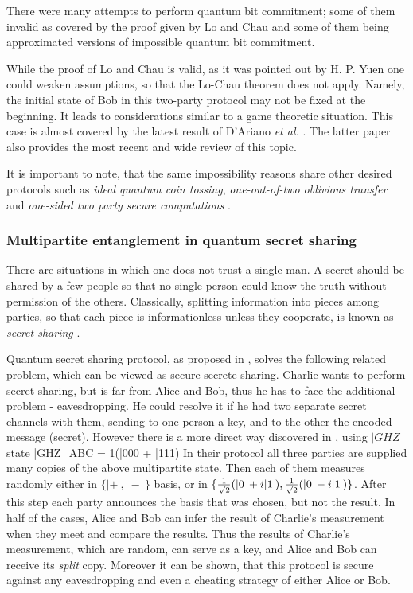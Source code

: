 \documentclass[twocolumn,aps,rmp]{revtex4}
\begin{document}
There were many attempts to perform quantum bit commitment; some of
them invalid as covered by the proof given by Lo and Chau and some
of them being approximated versions of impossible quantum bit
commitment.

While the proof of Lo and Chau is valid, as it was  pointed out by
H. P. Yuen \cite{Yuen_bc} one could weaken assumptions, so that the
Lo-Chau theorem does not apply.  Namely, the initial state of Bob in
this two-party protocol may not be fixed at the beginning. It leads
to considerations similar to a game theoretic situation.
This case is almost covered by the latest result of D'Ariano {\it et
al.} \cite{DAriano_bc}. The latter paper also provides the most recent and
wide review of this topic.

It is important to note, that the same impossibility reasons share other desired protocols such as {\it ideal quantum coin tossing}, {\it one-out-of-two oblivious transfer} and {\it one-sided two party secure computations}
\cite{LoChau_nobitcom2,Lo_noseccomp}.

\subsubsection{Multipartite entanglement in quantum secret sharing}
There are situations in which one does not trust a single man. A
secret should be shared by a few people so that no single person
could know the truth without permission of the others. Classically,
splitting information into pieces among parties, so that each piece
is informationless unless they cooperate, is known as {\it secret
sharing} \cite{Blakley,Shamir}.

Quantum secret sharing protocol, as proposed in \cite{Hillery_secret_sharing}, solves the following related problem, which can be viewed as secure secrete sharing. Charlie wants to perform secret sharing, but is far from Alice and Bob, thus he has to face the additional problem - eavesdropping. He could resolve it if he had two separate secret channels with them,  sending to one person a key, and to the other the encoded message (secret). However there is a more direct way  discovered in \cite{Hillery_secret_sharing}, using $|GHZ\>$ state \be |GHZ\>_{ABC} ={ 1}(|000\> + |111\>) \ee In their protocol all three parties are supplied many copies of the above multipartite state. Then each of them measures randomly either in $\{|+\>,|-\>\}$ basis, or in $\{{
1\over{\sqrt{2}}}(|0\>+i|1\>),{ 1\over{\sqrt{2}}}(|0\>-i|1\>)\}$.
After this step each party announces the basis that was
chosen, but not the result. In half of the cases, Alice and Bob can
infer the result of Charlie's measurement when they meet
and compare the results. Thus the results of Charlie's
measurement, which are random, can serve as a key, and Alice and
Bob can receive its {\it split} copy. Moreover it can be shown, that
this protocol is secure against any eavesdropping and even a
cheating strategy of either Alice or Bob.
\end{document}
